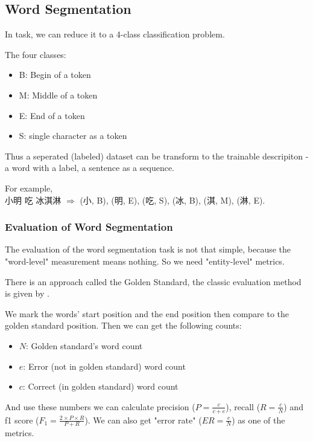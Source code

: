 \subsection{Word Segmentation}
\label{sec:cws}

In  task, we can reduce it to a 4-class classification problem.

The four classes:

\begin{itemize}
    \item B: Begin of a token
    \item M: Middle of a token
    \item E: End of a token
    \item S: single character as a token
\end{itemize}

Thus a seperated (labeled) dataset can be transform to the trainable descripiton - a word with a label, a sentence as a sequence.

For example, \\ 小明 吃 冰淇淋 $\Rightarrow$ (小, B), (明, E), (吃, S), (冰, B), (淇, M), (淋, E).

\subsubsection*{Evaluation of Word Segmentation}
\label{sec:cws_eval}

The evaluation of the word segmentation task is not that simple, because the "word-level" measurement means nothing. So we need "entity-level" metrics.

There is an approach called the Golden Standard, the classic evaluation method is given by .

We mark the words' start position and the end position then compare to the golden standard position. Then we can get the following counts:

\begin{itemize}
    \item $N$: Golden standard's word count
    \item $e$: Error (not in golden standard) word count
    \item $c$: Correct (in golden standard) word count
\end{itemize}

And use these numbers we can calculate precision ($P=\frac{c}{c+e}$), recall ($R=\frac{c}{N}$) and f1 score ($F_1=\frac{2\times P\times R}{P+R}$). We can also get "error rate" ($ER=\frac{e}{N}$) as one of the metrics.
